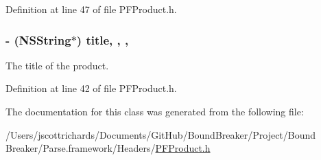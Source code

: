 Definition at line 47 of file P\+F\+Product.\+h.

\hypertarget{interface_p_f_product_aca711bfd74798b7d0563d5ff5719c6d9}{}
\subsubsection[{title}]{\setlength{\rightskip}{0pt plus 5cm}-\/ (N\+S\+String$\ast$) title\hspace{0.3cm}{\ttfamily [read]}, {\ttfamily [write]}, {\ttfamily [nonatomic]}, {\ttfamily [strong]}}\label{interface_p_f_product_aca711bfd74798b7d0563d5ff5719c6d9}
The title of the product. 

Definition at line 42 of file P\+F\+Product.\+h.



The documentation for this class was generated from the following file\+:\begin{DoxyCompactItemize}
\item 
/\+Users/jscottrichards/\+Documents/\+Git\+Hub/\+Bound\+Breaker/\+Project/\+Bound Breaker/\+Parse.\+framework/\+Headers/\hyperlink{_p_f_product_8h}{P\+F\+Product.\+h}\end{DoxyCompactItemize}
